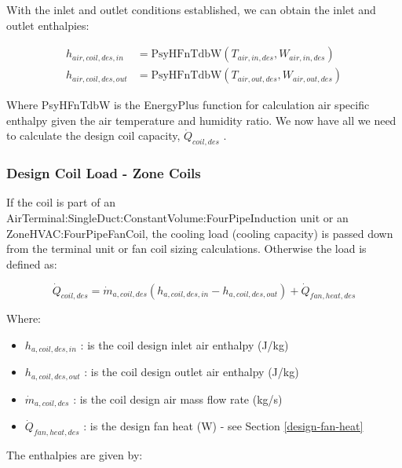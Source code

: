 With the inlet and outlet conditions established, we can obtain the inlet and outlet enthalpies:

\begin{equation}
 \begin{array}{rl}
  h_{air,coil,des,in} & = \text{PsyHFnTdbW}\left(T_{air,in,des},W_{air,in,des}\right) \\
  h_{air,coil,des,out} & = \text{PsyHFnTdbW}\left(T_{air,out,des},W_{air,out,des}\right)
 \end{array}
\end{equation}

Where PsyHFnTdbW is the EnergyPlus function for calculation air specific enthalpy given the air temperature and humidity ratio. We now have all we need to calculate the design coil capacity, \(\dot{Q}_{coil,des}\) .

\subsubsection{Design Coil Load - Zone Coils}\label{design-coil-load---zone-coils}

If the coil is part of an AirTerminal:SingleDuct:ConstantVolume:FourPipeInduction unit or an ZoneHVAC:FourPipeFanCoil, the cooling load (cooling capacity) is passed down from the terminal unit or fan coil sizing calculations. Otherwise the load is defined as:

\begin{equation}
\dot{Q}_{coil,des} = \dot{m}_{a,coil,des}\left(h_{a,coil,des,in}-h_{a,coil,des,out}\right) + \dot{Q}_{fan,heat,des}
\end{equation}

Where:

\begin{itemize}
\item
  \(h_{a,coil,des,in}\) : is the coil design inlet air enthalpy (J/kg)
\item
  \(h_{a,coil,des,out}\) : is the coil design outlet air enthalpy (J/kg)
\item
  \(\dot{m}_{a,coil,des}\) : is the coil design air mass flow rate (kg/s)
\item
  \(\dot{Q}_{fan,heat,des}\) : is the design fan heat (W) - see Section \ref{design-fan-heat}
\end{itemize}

The enthalpies are given by:

